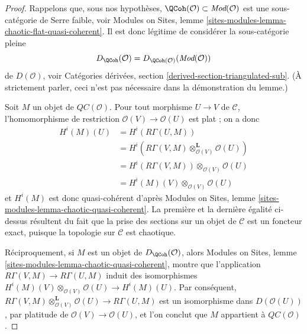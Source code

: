 \begin{proof}
Rappelons que, sous nos hypothèses,
$\QCoh(\mathcal{O}) \subset \textit{Mod}(\mathcal{O})$ est une sous-catégorie
de Serre faible, voir Modules on Sites, lemme
\ref{sites-modules-lemma-chaotic-flat-quasi-coherent}. Il est donc légitime de
considérer la sous-catégorie pleine
$$
D_\QCoh(\mathcal{O}) = D_{\QCoh(\mathcal{O})}(\textit{Mod}(\mathcal{O}))
$$
de $D(\mathcal{O})$, voir Catégories dérivées, section
\ref{derived-section-triangulated-sub}. (À strictement parler, ceci n'est pas
nécessaire dans la démonstration du lemme.)

\medskip\noindent
Soit $M$ un objet de $\mathit{QC}(\mathcal{O})$. Pour tout morphisme
$U \to V$ de $\mathcal{C}$, l'homomorphisme de restriction
$\mathcal{O}(V) \to \mathcal{O}(U)$ est plat ; on a donc
\begin{align*}
H^i(M)(U)
& =
H^i(R\Gamma(U, M)) \\
& =
H^i(R\Gamma(V, M) \otimes_{\mathcal{O}(V)}^\mathbf{L} \mathcal{O}(U)) \\
& =
H^i(R\Gamma(V, M)) \otimes_{\mathcal{O}(V)} \mathcal{O}(U) \\
& =
H^i(M)(V) \otimes_{\mathcal{O}(V)} \mathcal{O}(U)
\end{align*}
et $H^i(M)$ est donc quasi-cohérent d'après Modules on Sites, lemme
\ref{sites-modules-lemma-chaotic-quasi-coherent}. La première et la dernière
égalité ci-dessus résultent du fait que la prise des sections sur un objet de
$\mathcal{C}$ est un foncteur exact, puisque la topologie sur $\mathcal{C}$
est chaotique.

\medskip\noindent
Réciproquement, si $M$ est un objet de $D_\QCoh(\mathcal{O})$, alors Modules
on Sites, lemme \ref{sites-modules-lemma-chaotic-quasi-coherent}, montre que
l'application $R\Gamma(V, M) \to R\Gamma(U, M)$ induit des isomorphismes
$H^i(M)(V) \otimes_{\mathcal{O}(V)} \mathcal{O}(U) \to H^i(M)(U)$.
Par conséquent,
$R\Gamma(V, M) \otimes_{\mathcal{O}(V)}^\mathbf{L} \mathcal{O}(U)
\to R\Gamma(U, M)$ est un isomorphisme dans $D(\mathcal{O}(U))$, par platitude
de $\mathcal{O}(V) \to \mathcal{O}(U)$, et l'on conclut que $M$ appartient à
$\mathit{QC}(\mathcal{O})$.
\end{proof}

